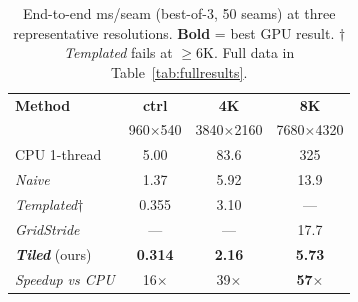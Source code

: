 \begin{table}[t]
\caption{End-to-end ms/seam (best-of-3, 50 seams) at three representative
resolutions. \textbf{Bold} = best GPU result.
$\dagger$\emph{Templated} fails at ${\ge}6$K. Full data in Table~\ref{tab:fullresults}.}
\label{tab:e2e}
\centering
\begin{tabular}{@{}lccc@{}}
\toprule
\textbf{Method} & \textbf{ctrl} & \textbf{4K} & \textbf{8K} \\
 & {\scriptsize 960$\times$540} & {\scriptsize 3840$\times$2160} & {\scriptsize 7680$\times$4320} \\
\midrule
CPU 1-thread              & 5.00  & 83.6  & 325   \\
\emph{Naive}              & 1.37  & 5.92  & 13.9  \\
\emph{Templated}$\dagger$ & 0.355 & 3.10  & ---   \\
\emph{GridStride}         & ---   & ---   & 17.7  \\
\textbf{\emph{Tiled}} (ours) & \textbf{0.314} & \textbf{2.16} & \textbf{5.73} \\
\midrule
\emph{Speedup vs CPU}     & 16$\times$ & 39$\times$ & \textbf{57$\times$} \\
\bottomrule
\end{tabular}
\end{table}
